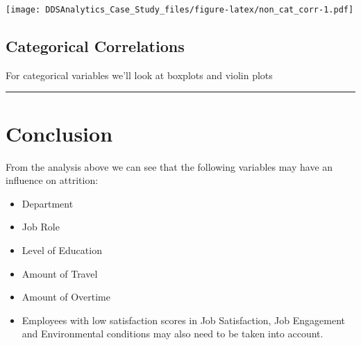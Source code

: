 \documentclass[]{article}
\providecommand{\tightlist}{%
  \setlength{\itemsep}{0pt}\setlength{\parskip}{0pt}}
\begin{document}
\texttt{[image: DDSAnalytics\_Case\_Study\_files/figure-latex/non\_cat\_corr-1.pdf]}

\subsection{Categorical Correlations}\label{categorical-correlations}

For categorical variables we'll look at boxplots and violin plots

\begin{center}\rule{0.5\linewidth}{\linethickness}\end{center}

\section{Conclusion}\label{conclusion}

From the analysis above we can see that the following variables may have
an influence on attrition:

\begin{itemize}
\tightlist
\item
  Department
\item
  Job Role
\item
  Level of Education
\item
  Amount of Travel
\item
  Amount of Overtime
\item
  Employees with low satisfaction scores in Job Satisfaction, Job
  Engagement and Environmental conditions may also need to be taken into
  account.
\end{itemize}
\end{document}
